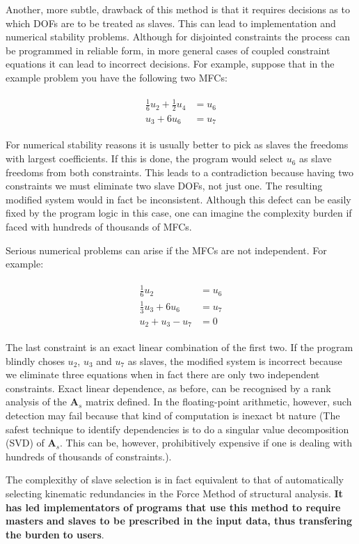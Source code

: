 \documentclass[10pt,b5paper,titlepage]{book}
\newenvironment{eqarray}
{
    \begin{eqnarray}
        \begin{aligned}
}
{
        \end{aligned}
    \end{eqnarray}
}
\begin{document}
Another, more subtle, drawback of this method is that it requires decisions as to
which DOFs are to be treated as slaves. This can lead to implementation and numerical
stability problems. Although for disjointed constraints the process can be programmed
in reliable form, in more general cases of coupled constraint equations it can
lead to incorrect decisions. For example, suppose that in the example problem
you have the following two MFCs:

\begin{eqarray}
    \frac{1}{6} u_2 + \frac{1}{2} u_4 &= u_6 \\
    u_3 + 6 u_6 &= u_7
\end{eqarray}

For numerical stability reasons it is usually better to pick as slaves the freedoms
with largest coefficients. If this is done, the program would select $ u_6 $ as
slave freedoms from both constraints. This leads to a contradiction because
having two constraints we must eliminate two slave DOFs, not just one. The resulting
modified system would in fact be inconsistent. Although this defect can be easily fixed
by the program logic in this case, one can imagine the complexity burden if faced
with hundreds of thousands of MFCs.

Serious numerical problems can arise if the MFCs are not independent. For example:

\begin{eqarray}
    \frac{1}{6} u_2 &= u_6 \\
    \frac{1}{3} u_3 + 6 u_6 &= u_7 \\
    u_2 + u_3 - u_7 &= 0
\end{eqarray}

The last constraint is an exact linear combination of the first two. If the program
blindly choses $ u_2 $, $ u_3 $ and $ u_7 $ as slaves, the modified system is
incorrect because we eliminate three equations when in fact there are only two
independent constraints. Exact linear dependence, as before, can be recognised by
a rank analysis of the $ \mathbf{A}_s $ matrix defined. In the floating-point
arithmetic, however, such detection may fail because that kind of computation is
inexact bt nature (The safest technique to identify dependencies is to do
a singular value decomposition (SVD) of $ \mathbf{A}_s $. This can be, however,
prohibitively expensive if one is dealing with hundreds of thousands of constraints.).

The complexithy of slave selection is in fact equivalent to that of automatically
selecting kinematic redundancies in the Force Method of structural analysis.
\textbf{It has led implementators of programs that use this method to require masters}
\textbf{and slaves to be prescribed in the input data, thus transfering the burden}
\textbf{to users}.
\end{document}
